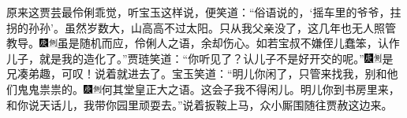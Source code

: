 原来这贾芸最伶俐乖觉，听宝玉这样说，便笑道：``俗语说的，`摇车里的爷爷，拄拐的孙孙'。虽然岁数大，山高高不过太阳。只从我父亲没了，这几年也无人照管教导。{\includegraphics[width=3mm]{../Images/00004}\includegraphics[width=3mm]{../Images/00011}\footnotesize \kaishu 虽是随机而应，伶俐人之语，余却伤心。}如若宝叔不嫌侄儿蠢笨，认作儿子，就是我的造化了。''贾琏笑道：``你听见了？认儿子不是好开交的呢。''{\includegraphics[width=3mm]{../Images/00004}\includegraphics[width=3mm]{../Images/00011}\footnotesize \kaishu 是兄凑弟趣，可叹！}说着就进去了。宝玉笑道：``明儿你闲了，只管来找我，别和他们鬼鬼祟祟的。{\includegraphics[width=3mm]{../Images/00004}\includegraphics[width=3mm]{../Images/00011}\footnotesize \kaishu 何其堂皇正大之语。}这会子我不得闲儿。明儿你到书房里来，和你说天话儿，我带你园里顽耍去。''说着扳鞍上马，众小厮围随往贾赦这边来。

